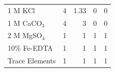 \begin{table}[h!]
{\begin{tabular}{p{4cm}p{2cm}p{2cm}p{2cm}p{2cm}}
    1 M KCl                 & \multicolumn{1}{r}{4}                 & \multicolumn{1}{r}{1.33}              & \multicolumn{1}{r}{0}         & \multicolumn{1}{r}{0}  \\
    1 M CaCO$_3$            & \multicolumn{1}{r}{4}                 & \multicolumn{1}{r}{3}                 & \multicolumn{1}{r}{0}         & \multicolumn{1}{r}{0} \\
    2 M MgSO$_4$            & \multicolumn{1}{r}{1}                 & \multicolumn{1}{r}{1}                 & \multicolumn{1}{r}{1}         & \multicolumn{1}{r}{1} \\
    10\% Fe-EDTA            & \multicolumn{1}{r}{1}                 & \multicolumn{1}{r}{1}                 & \multicolumn{1}{r}{1}         & \multicolumn{1}{r}{1} \\
    Trace Elements          & \multicolumn{1}{r}{1}                 & \multicolumn{1}{r}{1}                 & \multicolumn{1}{r}{1}         & \multicolumn{1}{r}{1} \\
    \hline
    \end{tabular}%
    }
    \end{table}
\clearpage

